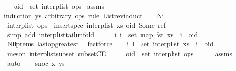 \begin{isabellebody}
\ \ \ {\isachardoublequoteopen}oid\ {\isasymnotin}\ set\ {\isacharparenleft}interp{\isacharunderscore}list\ ops{\isacharparenright}{\isachardoublequoteclose}\isanewline
%
\isadelimproof
%
\endisadelimproof
%
\isatagproof
{}\isamarkupfalse%
\ assms\ \isamarkupfalse%
{\isacharparenleft}induction\ ys\ arbitrary{\isacharcolon}\ ops\ rule{\isacharcolon}\ List{\isachardot}rev{\isacharunderscore}induct{\isacharparenright}\isanewline
\ \ \isamarkupfalse%
\ Nil\isanewline
\ \ \isamarkupfalse%
\ \isamarkupfalse%
\ {\isachardoublequoteopen}interp{\isacharunderscore}list\ ops\ {\isacharequal}\ insert{\isacharunderscore}spec\ {\isacharparenleft}interp{\isacharunderscore}list\ xs{\isacharparenright}\ {\isacharparenleft}oid{\isacharcomma}\ Some\ ref{\isacharparenright}{\isachardoublequoteclose}\isanewline
\ \ \ \ \isamarkupfalse%
\ {\isacharparenleft}simp\ add{\isacharcolon}\ interp{\isacharunderscore}list{\isacharunderscore}tail{\isacharunderscore}unfold{\isacharparenright}\isanewline
\ \ \isamarkupfalse%
\ \isamarkupfalse%
\ {\isachardoublequoteopen}{\isasymAnd}i{\isachardot}\ i\ {\isasymin}\ set\ {\isacharparenleft}map\ fst\ xs{\isacharparenright}\ {\isasymLongrightarrow}\ i\ {\isacharless}\ oid{\isachardoublequoteclose}\isanewline
\ \ \ \ \isamarkupfalse%
\ Nil{\isachardot}prems\ last{\isacharunderscore}op{\isacharunderscore}greatest\ \isamarkupfalse%
\ fastforce\isanewline
\ \ \isamarkupfalse%
\ {\isachardoublequoteopen}{\isasymAnd}i{\isachardot}\ i\ {\isasymin}\ set\ {\isacharparenleft}interp{\isacharunderscore}list\ xs{\isacharparenright}\ {\isasymLongrightarrow}\ i\ {\isacharless}\ oid{\isachardoublequoteclose}\isanewline
\ \ \ \ \isamarkupfalse%
\ {\isacharparenleft}meson\ interp{\isacharunderscore}list{\isacharunderscore}subset\ subsetCE{\isacharparenright}\isanewline
\ \ \isamarkupfalse%
\ \isamarkupfalse%
\ {\isachardoublequoteopen}oid\ {\isasymnotin}\ set\ {\isacharparenleft}interp{\isacharunderscore}list\ ops{\isacharparenright}{\isachardoublequoteclose}\isanewline
\ \ \ \ \isamarkupfalse%
\ assms{\isacharparenleft}{}{\isacharparenright}\ \isamarkupfalse%
\ auto\isanewline
{}\isamarkupfalse%
\isanewline
\ \ \isamarkupfalse%
\ {\isacharparenleft}snoc\ x\ ys{\isacharparenright}\isanewline
\ \ \isamarkupfalse%

\end{isabellebody}
